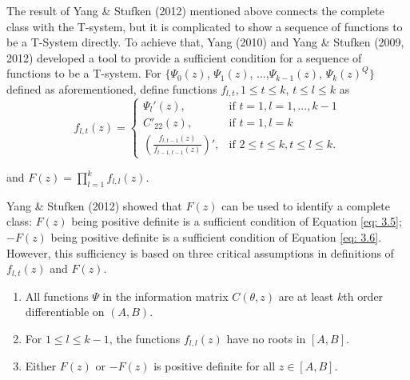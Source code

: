 \documentclass[12pt]{TD-CJS}
\begin{document}
The result of Yang \& Stufken (2012) mentioned above connects the complete class with the T-system, but it is complicated to show a sequence of functions to be a T-System directly. To achieve that, Yang (2010) and Yang \& Stufken (2009, 2012) developed a tool to provide a sufficient condition for a sequence of functions to be a T-system. For $\{\Psi_0(z)$, $\Psi_1(z)$, $\ldots$,$\Psi_{k-1}(z)$, $\Psi_k(z)^Q\}$ defined as aforementioned, define functions $f_{l,t}, 1\le t \le k$, $t\le l \le k$ as
\begin{equation}
    \label{eq: ff}
f_{l,t}(z) = \left \{ \begin{array}{ll}
\Psi_l'(z), & \text{if } t=1,l=1,...,k-1\\
C'_{22}(z), & \text{if } t=1,l=k\\
(\frac{f_{l,t-1}(z)}{f_{t-1,t-1}(z)})', & \text{if } 2\le t\le k, t\le l \le k.
\end{array}\right.
\end{equation}

and   $F(z) = \prod_{l=1}^k f_{l,l}(z)$. 

Yang \& Stufken (2012) showed that $F(z)$ can be used to identify a complete class: $F(z)$ being positive definite is a sufficient condition of Equation \eqref{eq: 3.5}; $-F(z)$ being positive definite is a sufficient condition of Equation \eqref{eq: 3.6}. However, this sufficiency is based on three critical assumptions in definitions of $f_{l,t}(z)$ and $F(z)$.
\begin{enumerate}[(1)]
\item All functions $\Psi$ in the information matrix $C(\theta,z)$ are at least $k$th order differentiable on $(A,B)$.
\item For $1\le l\le k-1$, the functions $f_{l,l}(z)$ have no roots in $[A,B]$.
\item Either $F(z)$ or $-F(z)$ is positive definite for all $z\in [A,B]$.
\end{enumerate} 
\end{document}
